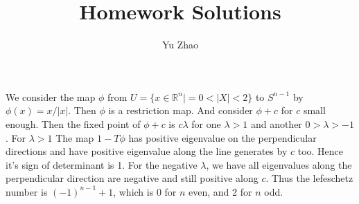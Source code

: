 \documentclass[10pt,letterpaper]{article}
\makeatletter
\newcommand{\R}{\mathbb{R}}
\newcommand\course[1]{\renewcommand\@course{#1}}
\newcommand\@course{}
\newcommand\term[1]{\renewcommand\@term{#1}}
\newcommand\@term{}
\theoremstyle{plain}
\theoremstyle{definition}
\theoremstyle{remark}
\makeatother
\begin{document}
\course{Differential topology}
\term{}
\title{Homework  Solutions}
\author{Yu Zhao}
\maketitle

We consider the map $\phi$ from $U=\{x\in \R^n|= 0<|X|<2\}$ to $S^{n-1}$ by $\phi(x)=x/|x|$. Then $\phi$ is a restriction map. And consider $\phi+c$ for $c$ small enough. Then the fixed point of $\phi+c$ is $c\lambda$ for one $\lambda>1$ and another $0> \lambda>-1$. For $\lambda>1$ The map $1-T\phi$ has positive eigenvalue on the perpendicular directions and have positive eigenvalue along the line generates by $c$ too. Hence it's sign of  determinant is 1. For the negative $\lambda$, we have all eigenvalues along the perpendicular direction are negative and still positive along $c$. Thus the lefeschetz number is $(-1)^{n-1}+1$, which  is $0$ for $n$ even, and 2 for $n$ odd.
\end{document}
